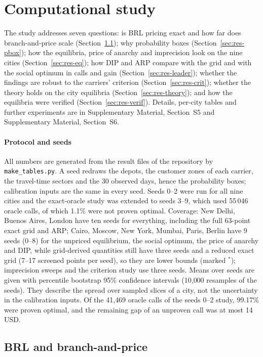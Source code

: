 \documentclass[preprint,11pt]{elsarticle}
\theoremstyle{definition}
\theoremstyle{remark}
\newcommand{\SM}[1]{Supplementary Material, Section~#1}
\begin{document}
\section{Computational study}\label{sec:results}

The study addresses seven questions: is BRL pricing exact and how far does branch-and-price scale (Section~\ref{sec:res-brl}); why probability boxes (Section~\ref{sec:res-pbox}); how the equilibria, price of anarchy and imprecision look on the nine cities (Section~\ref{sec:res-eq}); how DIP and ARP compare with the grid and with the social optimum in calls and gain (Section~\ref{sec:res-leader}); whether the findings are robust to the carriers' criterion (Section~\ref{sec:res-crit}); whether the theory holds on the city equilibria (Section~\ref{sec:res-theory}); and how the equilibria were verified (Section~\ref{sec:res-verif}). Details, per-city tables and further experiments are in \SM{S5} and \SM{S6}.

\paragraph{Protocol and seeds} All numbers are generated from the result files of the repository by \texttt{make\_tables.py}. A seed redraws the depots, the customer zones of each carrier, the travel-time sectors and the 30 observed days, hence the probability boxes; calibration inputs are the same in every seed. Seeds 0--2 were run for all nine cities and the exact-oracle study was extended to seeds 3--9, which used 55\,046 oracle calls, of which 1.1\% were not proven optimal. Coverage: New Delhi, Buenos Aires, London have ten seeds for everything, including the full 63-point exact grid and ARP; Cairo, Moscow, New York, Mumbai, Paris, Berlin have 9 seeds (0--8) for the unpriced equilibrium, the social optimum, the price of anarchy and DIP, while grid-derived quantities still have three seeds and a reduced exact grid (7--17 screened points per seed), so they are lower bounds (marked $^*$); imprecision sweeps and the criterion study use three seeds. Means over seeds are given with percentile bootstrap 95\% confidence intervals (10{,}000 resamples of the seeds). They describe the spread over sampled slices of a city, not the uncertainty in the calibration inputs. Of the 41{,}469 oracle calls of the seeds 0--2 study, 99.17\% were proven optimal, and the remaining gap of an unproven call was at most 14 USD.

\subsection{BRL and branch-and-price}\label{sec:res-brl}
\end{document}
